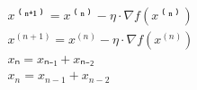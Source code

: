 \documentclass{unittest}
\begin{document}
\(\begin{array}{lll}
\\ x⁽ⁿ⁺¹⁾ = x⁽ⁿ⁾ - η⋅∇f(x⁽ⁿ⁾)
\\ x^{(n+1)} = x^{(n)} - \eta\cdot\nabla f(x^{(n)})
\\ xₙ = xₙ₋₁ + xₙ₋₂
\\ x_n = x_{n-1} + x_{n-2}
\end{array}\)
\end{document}
